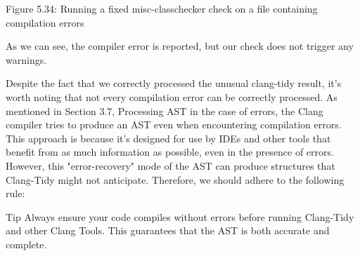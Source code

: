 \begin{center}
Figure 5.34: Running a fixed misc-classchecker check on a file containing compilation errors
\end{center}

As we can see, the compiler error is reported, but our check does not trigger any warnings.

Despite the fact that we correctly processed the unusual clang-tidy result, it's worth noting that not every compilation error can be correctly processed. As mentioned in Section 3.7, Processing AST in the case of errors, the Clang compiler tries to produce an AST even when encountering compilation errors. This approach is because it's designed for use by IDEs and other tools that benefit from as much information as possible, even in the presence of errors. However, this "error-recovery" mode of the AST can produce structures that Clang-Tidy might not anticipate. Therefore, we should adhere to the following rule:


\begin{myTip}{Tip}
Always ensure your code compiles without errors before running Clang-Tidy and other Clang Tools. This guarantees that the AST is both accurate and complete.
\end{myTip}

